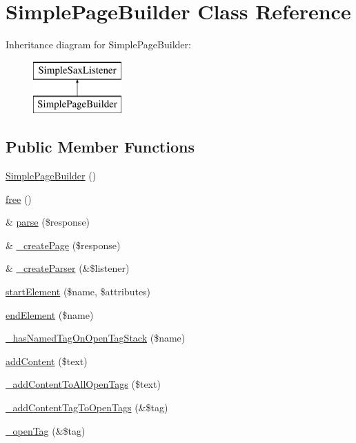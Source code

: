 \hypertarget{class_simple_page_builder}{
\section{SimplePageBuilder Class Reference}
\label{class_simple_page_builder}
}
Inheritance diagram for SimplePageBuilder:\begin{figure}[H]
\begin{center}
\leavevmode
\includegraphics[height=2.000000cm]{class_simple_page_builder}
\end{center}
\end{figure}
\subsection*{Public Member Functions}
\begin{DoxyCompactItemize}
\item 
\hyperlink{class_simple_page_builder_aa78adff50b24bb29981c9c655905b10c}{SimplePageBuilder} ()
\item 
\hyperlink{class_simple_page_builder_ae4ebd7ba464976aeea6445eec30253e5}{free} ()
\item 
\& \hyperlink{class_simple_page_builder_a9e5064b871d06f5b601184d7c3ca1567}{parse} (\$response)
\item 
\& \hyperlink{class_simple_page_builder_afd4eea32d22fe5fb09470d82665879d2}{\_\-createPage} (\$response)
\item 
\& \hyperlink{class_simple_page_builder_af61f0142faa51a5636b4a7f1de3e069a}{\_\-createParser} (\&\$listener)
\item 
\hyperlink{class_simple_page_builder_a7b40a556918f88bd570eed376ad36b7e}{startElement} (\$name, \$attributes)
\item 
\hyperlink{class_simple_page_builder_a9c074127728a8588dac8dbf5c0f05439}{endElement} (\$name)
\item 
\hyperlink{class_simple_page_builder_abb0453d71690ec08dd4286aae3d1d83b}{\_\-hasNamedTagOnOpenTagStack} (\$name)
\item 
\hyperlink{class_simple_page_builder_a324ad1e5d69787482a64319a095e09c7}{addContent} (\$text)
\item 
\hyperlink{class_simple_page_builder_aa810b100737abf41b2f93439d4f3dfa4}{\_\-addContentToAllOpenTags} (\$text)
\item 
\hyperlink{class_simple_page_builder_ab4a16684ccda1f0d1241eb95f693efad}{\_\-addContentTagToOpenTags} (\&\$tag)
\item 
\hyperlink{class_simple_page_builder_a68669a93a330af377812cc921efc94ac}{\_\-openTag} (\&\$tag)
\end{DoxyCompactItemize}
